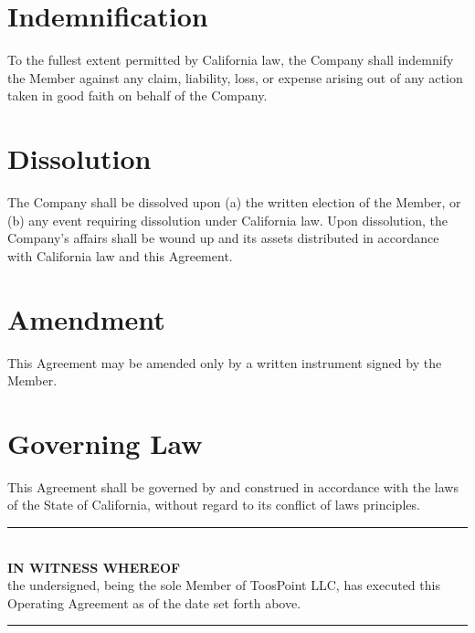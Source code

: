 \documentclass{toospoint}
\begin{document}
\section{Indemnification}

To the fullest extent permitted by California law, the Company shall
indemnify the Member against any claim, liability, loss, or expense
arising out of any action taken in good faith on behalf of the Company.

\section{Dissolution}

The Company shall be dissolved upon (a) the written election of the
Member, or (b) any event requiring dissolution under California law.
Upon dissolution, the Company's affairs shall be wound up and its assets
distributed in accordance with California law and this Agreement.

\section{Amendment}

This Agreement may be amended only by a written instrument signed by the
Member.

\section{Governing Law}

This Agreement shall be governed by and construed in accordance with the
laws of the State of California, without regard to its conflict of laws
principles.

\vspace{28pt}

\begin{center}
  {\color{TPBorder}\rule{0.7\textwidth}{0.5pt}}\\[6pt]
  {\sffamily\bfseries\color{TPDark}IN WITNESS WHEREOF}\\[4pt]
  {\sffamily\small\color{TPGray}the undersigned, being the sole Member of ToosPoint LLC, has executed this Operating Agreement as of the date set forth above.}\\[6pt]
  {\color{TPBorder}\rule{0.7\textwidth}{0.5pt}}
\end{center}
\end{document}
